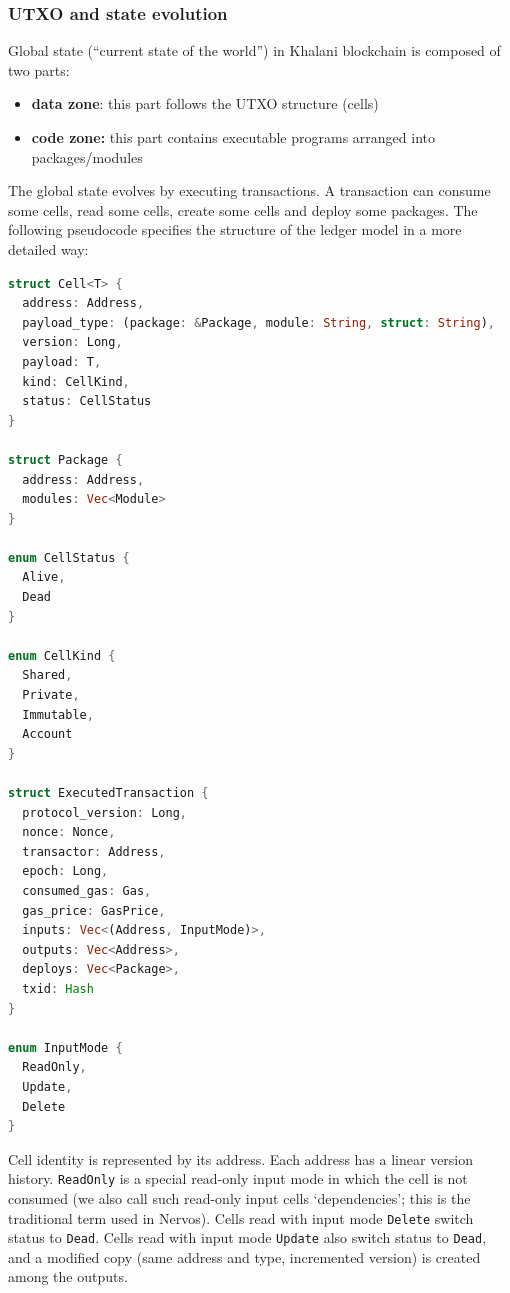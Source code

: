 \documentclass[a4paper]{article}
\newcommand{\code}[1]{{\small \texttt{#1}}}
\begin{document}
\subsubsection{UTXO and state evolution}

Global state (``current state of the world'') in Khalani blockchain is composed of two parts:

\begin{itemize}
  \item \textbf{data zone}: this part follows the UTXO structure (cells)
  \item \textbf{code zone:} this part contains executable programs arranged into packages/modules
\end{itemize}

The global state evolves by executing transactions. A transaction can consume some cells, read some cells, create some cells and deploy some packages. The following pseudocode specifies the structure of the ledger model in a more detailed way:

\begin{lstlisting}[language=Rust]
struct Cell<T> {
  address: Address,
  payload_type: (package: &Package, module: String, struct: String),
  version: Long,
  payload: T,
  kind: CellKind,
  status: CellStatus
}

struct Package {
  address: Address,
  modules: Vec<Module>
}

enum CellStatus {
  Alive,
  Dead
}

enum CellKind {
  Shared,
  Private,
  Immutable,
  Account
}

struct ExecutedTransaction {
  protocol_version: Long,
  nonce: Nonce,
  transactor: Address,
  epoch: Long,
  consumed_gas: Gas,
  gas_price: GasPrice,
  inputs: Vec<(Address, InputMode)>,
  outputs: Vec<Address>,
  deploys: Vec<Package>,
  txid: Hash
}

enum InputMode {
  ReadOnly,
  Update,
  Delete
}
\end{lstlisting}

Cell identity is represented by its address. Each address has a linear version history. \code{ReadOnly} is a special read-only input mode in which the cell is not consumed (we also call such read-only input cells `dependencies'; this is the traditional term used in Nervos). Cells read with input mode \code{Delete} switch status to \code{Dead}. Cells read with input mode \code{Update} also switch status to \code{Dead}, and a modified copy (same address and type, incremented version) is created among the outputs.
\end{document}

